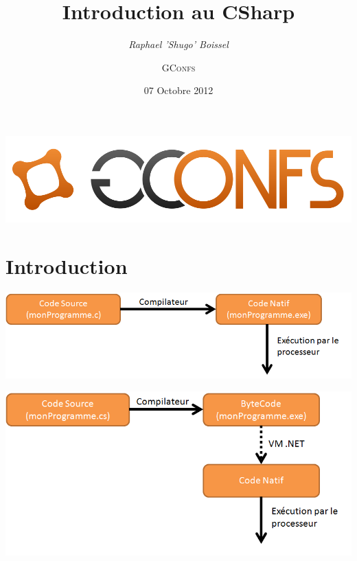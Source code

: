\documentclass{beamer}
\begin{document}
\title{Introduction au CSharp}
\author{\textit{Raphael 'Shugo' Boissel} \and \textsc{GConfs}}
\date{07 Octobre 2012}

\begin{frame}
  \begin{center}
    \includegraphics[scale=0.35]{images/gconfs.png}
  \end{center}

  \maketitle
\end{frame}

\begin{frame}
  \tableofcontents
\end{frame}

\section{Introduction}
\begin{frame}
  \begin{center}
    \includegraphics[scale=0.50]{images/comp_nat.png}
  \end{center}
\end{frame}

\begin{frame}
  \begin{center}
    \includegraphics[scale=0.40]{images/comp_bc.png}
  \end{center}
\end{frame}
\end{document}
